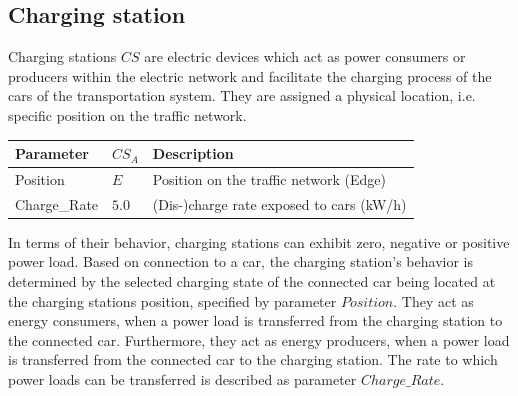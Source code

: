 \subsection{Charging station}

Charging stations $CS$ are electric devices which act as power consumers or producers within the electric network and facilitate the charging process of the cars of the transportation system. They are assigned a physical location, i.e. specific position on the traffic network. 

\begin{table}[h]
	\renewcommand{\arraystretch}{1.3}
	\centering
	\begin{tabularx}{\columnwidth}{llX}
		\hline
		\textbf{Parameter}      & \textbf{$CS_{A}$} & \textbf{Description} \\ \hline
		Position      			& $E$ & Position on the traffic network (Edge) \\  
		Charge\_Rate        	& $5.0$ & (Dis-)charge rate exposed to cars (kW/h)     \\ \hline
	\end{tabularx}
\end{table}

In terms of their behavior, charging stations can exhibit zero, negative or positive power load. Based on connection to a car, the charging station's behavior is determined by the selected charging state of the connected car being located at the charging stations position, specified by parameter $Position$. They act as energy consumers, when a power load is transferred from the charging station to the connected car. Furthermore, they act as energy producers, when a power load is transferred from the connected car to the charging station. The rate to which power loads can be transferred is described as parameter $Charge\_Rate$.